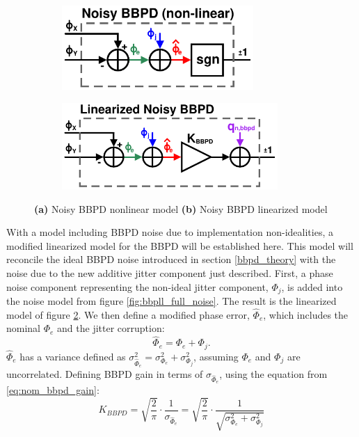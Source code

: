 	\begin{figure}[htb!]
	    \centering
	    \begin{subfigure}{0.5\textwidth}
	        \centering
	        \includegraphics[width=0.8\textwidth, angle=0]{figs/design/bbpd_noise_nonlinear}
	        \caption{ }
	        \label{fig:bbpd_noise_nonlinear}
	    \end{subfigure}%
	    \begin{subfigure}{0.5\textwidth}
	        \centering
	        \includegraphics[width=0.9\textwidth, angle=0]{figs/design/bbpd_noise_linear}
	        \caption{ }
	        \label{fig:bbpd_noise_linear}
	    \end{subfigure}
	    \caption{\textbf{(a)} Noisy BBPD nonlinear model \textbf{(b)} Noisy BBPD linearized model}
	     \label{fig:bbpd_noisy}
	\end{figure} 

	With a model including BBPD noise due to implementation non-idealities, a modified linearized model for the BBPD will be established here. This model will reconcile the ideal BBPD noise introduced in section \ref{bbpd_theory} with the noise due to the new additive jitter component just described. First, a phase noise component representing the non-ideal jitter component, $\Phi_j$, is added into the noise model from figure \ref{fig:bbpll_full_noise}. The result is the linearized model of figure \ref{fig:bbpd_noise_linear}. We then define a modified phase error, $\hat{\Phi}_e$, which includes the nominal $\Phi_e$ and the jitter corruption:
	\begin{equation}
	\hat{\Phi}_e = \Phi_e + \Phi_j.
	\end{equation}
	$\hat{\Phi}_e$ has a variance defined as $\sigma_{\hat{\Phi}_e}^2 = \sigma_{\Phi_e}^2 + \sigma_{\Phi_j}^2$, assuming $\Phi_e$ and $\Phi_j$ are uncorrelated. Defining BBPD gain in terms of $\sigma_{\hat{\Phi}_e}$, using the equation from \ref{eq:nom_bbpd_gain}:
	\begin{equation}
		K_{BBPD} = \sqrt{\frac{2}{\pi}}\cdot\frac{1}{\sigma_{\hat{\Phi}_e}} = \sqrt{\frac{2}{\pi}}\cdot\frac{1}{\sqrt{\sigma_{\Phi_e}^2 + \sigma_{\Phi_j}^2}}
	\end{equation}

